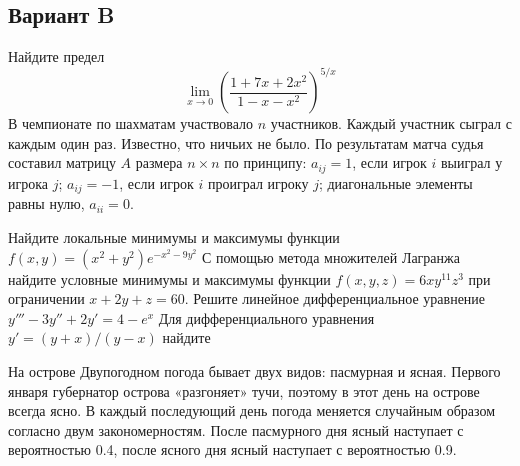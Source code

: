 \documentclass[addpoints, answers]{exam} %
\begin{document}
\subsection{Вариант B}
\begin{questions}
\question  Найдите предел
\[
\lim_{x\to 0} \left(\frac{1+7x+2x^2}{1-x-x^2} \right)^{5/x}
\]
\question В чемпионате по шахматам участвовало $n$ участников. Каждый участник сыграл с каждым один раз. Известно, что ничьих не было. По результатам матча судья составил матрицу $A$ размера $n\times n$ по принципу: $a_{ij}=1$, если игрок $i$ выиграл у игрока $j$; $a_{ij}=-1$, если игрок $i$ проиграл игроку $j$; диагональные элементы равны нулю, $a_{ii}=0$.
\question Найдите локальные минимумы и максимумы функции $f(x,y)=(x^2+y^2)e^{-x^2-9y^2}$
\question С помощью метода множителей Лагранжа найдите условные минимумы и максимумы функции $f(x,y,z)=6xy^{11}z^3$ при ограничении $x+2y+z=60$.
\question Решите линейное дифференциальное уравнение $y'''-3y''+2y'=4-e^{x}$
\question Для дифференциального уравнения $y'=(y+x)/(y-x)$ найдите
\question На острове Двупогодном погода бывает двух видов: пасмурная и ясная. Первого января губернатор острова «разгоняет»  тучи, поэтому в этот день на острове всегда ясно. В каждый последующий день погода меняется случайным образом согласно двум закономерностям. После пасмурного дня ясный наступает с  вероятностью 0.4, после ясного дня ясный наступает с вероятностью 0.9.
\begin{parts}

\end{parts}
\end{questions}
\end{document}
